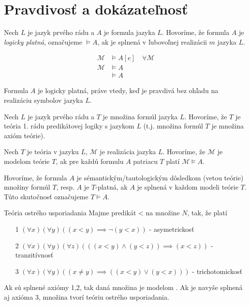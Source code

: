 \section{Pravdivosť a dokázateľnosť}

\begin{definicia}
    Nech $L$ je jazyk prvého rádu a $A$ je formula jazyka
    $L$. Hovoríme, že formula $A$ je \emph{logicky platná},
    označujeme $\models A$,
    ak je splnená v ľubovoľnej realizácii $m$ jazyka $L$.

    \begin{align*}
        \mathcal{M} & \models A[e] \quad \forall \mathcal{M} \\
        \mathcal{M} & \models A \\
        & \models A
    \end{align*}
\end{definicia}

\begin{poznamka}
    Formula $A$ je logicky platná, práve vtedy, keď je pravdivá
    bez ohľadu na realizáciu symbolov jazyka $L$.
\end{poznamka}

\begin{definicia}[Teória]
    Nech $L$ je jazyk prvého rádu a $T$ je množina formúl
    jazyka $L$. Hovoríme, že $T$ je teória 1. rádu predikátovej logiky
    s jazykom $L$ (t.j. množina formúl $T$ je množina axióm teórie).
\end{definicia}

\begin{definicia}
    Nech $T$ je teória v jazyku $L$, $\mathcal{M}$ je realizácia jazyka $L$.
    Hovoríme, že $\mathcal{M}$ je modelom teórie $T$, ak pre každú formulu $A$
    patriacu $T$ platí $\mathcal{M} \models A$.
\end{definicia}

\begin{definicia}
    Hovoríme, že formula $A$ je
    sémantickým/tautologickým dôsledkom (vetou teórie) množiny formúl $T$,
    resp. $A$ je $T$-platná, ak $A$ je splnená v každom modeli teórie $T$.
    Túto skutočnosť označujeme $T \models A$.
\end{definicia}

\begin{priklad}{Teória ostrého usporiadania}
    Majme predikát < na množine $N$, tak, že platí
    \begin{itemize}
    \item[1] $(\forall x)(\forall y) ((x < y) \implies \neg (y < x))$
    - asymetrickosť
    \item[2] $(\forall x)(\forall y)(\forall z) (((x<y) \land (y<z)) \implies
        (x<z))$ - tranzitívnosť
    \item[3] $(\forall x)(\forall y)( (x\not=y) \implies ((x<y) \lor (y<x)))$ -
     trichotomickosť
    \end{itemize}
    Ak sú splnené axiómy 1,2, tak daná množina je modelom \fixme{}. Ak je
    navyše splnená aj axióma 3, množina tvorí teóriu ostrého
    usporiadania.
\end{priklad}

